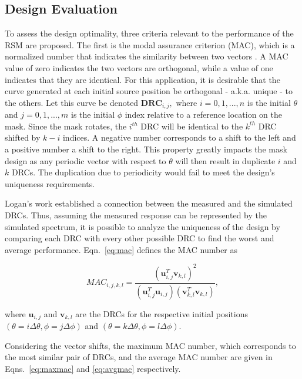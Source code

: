 \documentclass[3p,times]{elsarticle}
\begin{document}
\subsection{Design Evaluation}
To assess the design optimality, three criteria relevant to the performance of the RSM are proposed.  
The first is the modal assurance criterion (MAC), which is a normalized number that indicates the similarity between two vectors \cite{Allemang03}.  
A MAC value of zero indicates the two vectors are orthogonal, while a value of one indicates that they are identical.  
For this application, it is desirable that the curve generated at each initial source position be orthogonal - a.k.a. unique - to the others.  
Let this curve be denoted $\mathbf{DRC}_{i,j},$ where $i=0,1,...,n$ is the initial $\theta$ and $j=0,1,...,m$ is the initial $\phi$ index relative to a reference location on the mask.  
Since the mask rotates, the $i^{th}$ DRC will be identical to the $k^{th}$ DRC shifted by $k-i$ indices.  
A negative number corresponds to a shift to the left and a positive number a shift to the right.  
This property greatly impacts the mask design as any periodic vector with respect to $\theta$ will then result in duplicate $i$ and $k$ DRCs.  
The duplication due to periodicity would fail to meet the design's uniqueness requirements.

Logan's work established a connection between the measured and the simulated DRCs.
Thus, assuming the measured response can be represented by the simulated spectrum, it is possible to analyze the uniqueness of the design by comparing each DRC with every other possible DRC to find the worst and average performance.  
Eqn.~\ref{eq:mac} defines the MAC number as

\begin{equation}
MAC_{i,j,k,l}=\frac{\left(\mathbf{u}_{i,j}^T\mathbf{v}_{k,l}\right)^2}{\left(\mathbf{u}_{i,j}^T\mathbf{u}_{i,j}\right)\left(\mathbf{v}_{k,l}^T\mathbf{v}_{k,l}\right)},
\label{eq:mac}
\end{equation}

\noindent where $\mathbf{u}_{i,j}$ and $\mathbf{v}_{k,l}$ are the DRCs for the respective initial positions $\left(\theta=i\Delta\theta,\phi=j\Delta\phi\right)$ and
$\left(\theta=k\Delta\theta,\phi=l\Delta\phi\right)$.

Considering the vector shifts, the maximum MAC number, which corresponds to the most similar pair of DRCs, and the average MAC number are given in Eqns.~\ref{eq:maxmac} and \ref{eq:avgmac} respectively.
\end{document}
